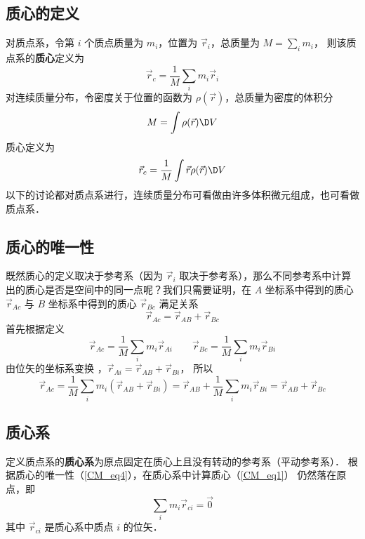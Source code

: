 

\subsection{质心的定义}

对质点系，令第 $i$ 个质点质量为 $m_i$，位置为 ${\vec r_i}$，总质量为 $M = \sum\limits_i {{m_i}}$， 则该质点系的\textbf{质心}定义为
\begin{equation}\label{CM_eq1}
{\vec r_c} = \frac{1}{M}\sum\limits_i {{m_i}{{\vec r}_i}} 
\end{equation}
对连续质量分布，令密度关于位置的函数为 $\rho (\vec r)$，总质量为密度的体积分 %
\begin{equation}
M = \int {\rho (\vec r)\D V} 
\end{equation}
质心定义为
\begin{equation}
{\vec r_c} = \frac{1}{M}\int {\vec r\rho (\vec r)\D V}
\end{equation}
以下的讨论都对质点系进行，连续质量分布可看做由许多体积微元组成，也可看做质点系．

\subsection{质心的唯一性}
既然质心的定义取决于参考系（因为 $\vec r_i$ 取决于参考系），那么不同参考系中计算出的质心是否是空间中的同一点呢？我们只需要证明，在 $A$ 坐标系中得到的质心 $\vec r_{Ac}$ 与 $B$ 坐标系中得到的质心 $\vec r_{Bc}$ 满足关系
\begin{equation}\label{CM_eq4}
{\vec r_{Ac}} = {\vec r_{AB}} + {\vec r_{Bc}}
\end{equation}
首先根据定义
\begin{equation}
{\vec r_{Ac}} = \frac{1}{M}\sum\limits_i {{m_i}{{\vec r}_{Ai}}} \qquad {\vec r_{Bc}} = \frac{1}{M}\sum\limits_i {{m_i}{{\vec r}_{Bi}}} 
\end{equation}
由位矢的坐标系变换%
，${\vec r_{Ai}} = {\vec r_{AB}} + {\vec r_{Bi}}$， 所以
\begin{equation}
{\vec r_{Ac}} = \frac{1}{M}\sum\limits_i {{m_i}({{\vec r}_{AB}} + {{\vec r}_{Bi}})}  = {\vec r_{AB}} + \frac{1}{M}\sum\limits_i {{m_i}{{\vec r}_{Bi}}}  = {\vec r_{AB}} + {\vec r_{Bc}}
\end{equation}
 
\subsection{质心系}
定义质点系的\textbf{质心系}为原点固定在质心上且没有转动的参考系（平动参考系）．%
根据质心的唯一性（\autoref{CM_eq4}），在质心系中计算质心（\autoref{CM_eq1}） 仍然落在原点，即
\begin{equation}\label{CM_eq7}
\sum\limits_i {{m_i}{{\vec r}_{ci}}} = \vec 0
\end{equation}
其中 $\vec r_{ci}$ 是质心系中质点 $i$ 的位矢．


